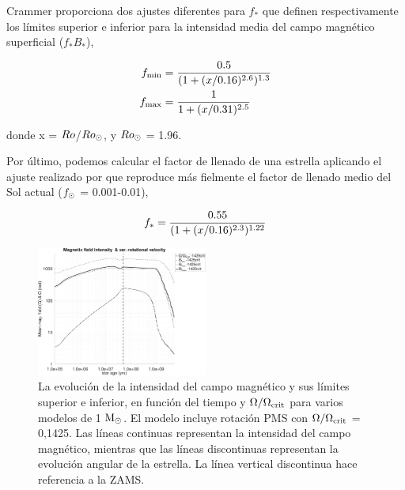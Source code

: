 \cite{Cranmer2011} Crammer proporciona dos ajustes diferentes para $f_*$ que definen respectivamente los límites superior e inferior para la intensidad media del campo magnético superficial ($f_*B_*$),

\begin{ceqn}
	\begin{align}
		f_{\mathrm{min}} &= \frac{0.5}{(1+(x/0.16)^{2.6})^{1.3}} \label{eq:fmin}\\
		f_{\mathrm{max}} &= \frac{1}{1+(x/0.31)^{2.5}} \label{eq:fmax}
	\end{align}
\end{ceqn}

donde x = $Ro$/$Ro_\odot$, y $Ro_\odot$ = 1.96. \par

Por último, podemos calcular el factor de llenado de una estrella aplicando el ajuste realizado por \cite{Gallet2013} que reproduce más fielmente el factor de llenado medio del Sol actual ($f_{\mathrm{\odot}}$ = 0.001-0.01),

\begin{ceqn}
	\begin{equation}
		f_{\mathrm{*}} = \frac{0.55}{(1+(x/0.16)^{2.3})^{1.22}} \label{eq:fstart}
	\end{equation}
\end{ceqn}

\begin{figure}
	\centering
	\includegraphics[width=0.5\textwidth]{img/paper2/mag_field_limits_var_vel_g3.pdf}
	\caption{La evolución de la intensidad del campo magnético y sus límites superior e inferior, en función del tiempo y $\Omega / \Omega_{\mathrm{crit}}$ para varios modelos de 1 $\mathrm{M}_\odot$. El modelo incluye rotación PMS con $\Omega / \Omega_{\mathrm{crit}}$ = 0,1425. Las líneas continuas representan la intensidad del campo magnético, mientras que las líneas discontinuas representan la evolución angular de la estrella. La línea vertical discontinua hace referencia a la ZAMS.}
	\label{fig:mag_field_limits_var_vel_g3}
\end{figure}

